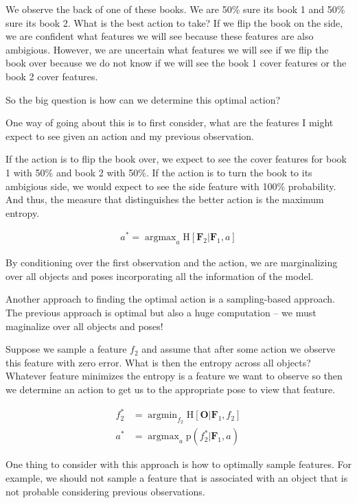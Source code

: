 \documentclass[11pt]{article}
\newcommand{\ProbOpr}[1]{\mathbb{#1}} %
\newcommand{\SetOf}[1]{\mathbf{#1}} %
\newcommand{\prob}[1]{\text{p}(#1)} %
\newcommand{\entropy}[1]{\text{H}[#1]} %
\DeclareMathOperator*{\argmin}{argmin}
\DeclareMathOperator*{\argmax}{argmax}
\newcommand{\Eq}[1]{\begin{align*}#1\end{align*}} %
\begin{document}
	We observe the back of one of these books. We are 50\% sure its book 1 and 50\% sure its book 2. What is the best action to take? If we flip the book on the side, we are confident what features we will see because these features are also ambigious. However, we are uncertain what features we will see if we flip the book over because we do not know if we will see the book 1 cover features or the book 2 cover features. 

	So the big question is how can we determine this optimal action?	

	One way of going about this is to first consider, what are the features I might expect to see given an action and my previous observation.


	If the action is to flip the book over, we expect to see the cover features for book 1 with 50\% and book 2 with 50\%. If the action is to turn the book to its ambigious side, we would expect to see the side feature with 100\% probability. And thus, the measure that distinguishes the better action is the maximum entropy. 

	\Eq{a^* = \argmax_{a} \entropy{\SetOf{F}_2|\SetOf{F}_1,a}}

	By conditioning over the first observation and the action, we are marginalizing over all objects and poses incorporating all the information of the model.

	Another approach to finding the optimal action is a sampling-based approach. The previous approach is optimal but also a huge computation -- we must maginalize over all objects and poses! 

	Suppose we sample a feature $f_2$ and assume that after some action we observe this feature with zero error. What is then the entropy across all objects? Whatever feature minimizes the entropy is a feature we want to observe so then we determine an action to get us to the appropriate pose to view that feature. 

	\Eq{f_2^* &= \argmin_{f_2} \entropy{\SetOf{O}|\SetOf{F}_1,f_2}\\
	a^* &= \argmax_a \prob{f_2^*|\SetOf{F}_1,a}}

	One thing to consider with this approach is how to optimally sample features. For example, we should not sample a feature that is associated with an object that is not probable considering previous observations.
\end{document}
